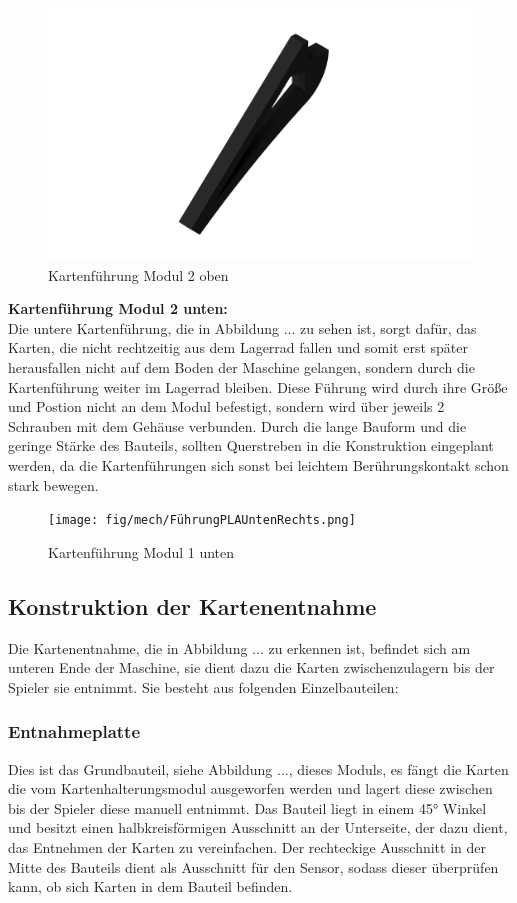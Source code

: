 \begin{figure}
    \centering
    \includegraphics[scale=0.5,page=1]{fig/mech/StopperOben.png}
    \caption{Kartenführung Modul 2 oben}
\end{figure}

\textbf{Kartenführung Modul 2 unten:}\\
Die untere Kartenführung, die in Abbildung ... zu sehen ist, sorgt dafür, das Karten, die nicht rechtzeitig aus dem Lagerrad fallen und somit erst später
herausfallen nicht auf dem Boden der Maschine gelangen, sondern durch die Kartenführung weiter im Lagerrad bleiben. Diese Führung
wird durch ihre Größe und Postion nicht an dem Modul befestigt, sondern wird über jeweils 2 Schrauben mit dem Gehäuse
verbunden. Durch die lange Bauform und die geringe Stärke des Bauteils, sollten Querstreben in die Konstruktion eingeplant werden,
da die Kartenführungen sich sonst bei leichtem Berührungskontakt schon stark bewegen.



\begin{figure}
    \centering
    \texttt{[image: fig/mech/FührungPLAUntenRechts.png]}
    \caption{Kartenführung Modul 1 unten}
\end{figure}

\subsection{Konstruktion der Kartenentnahme}
Die Kartenentnahme, die in Abbildung ... zu erkennen ist, befindet sich am unteren Ende der Maschine, sie dient dazu die Karten zwischenzulagern bis der Spieler
sie entnimmt. Sie besteht aus folgenden Einzelbauteilen:

\subsubsection{Entnahmeplatte }
Dies ist das Grundbauteil, siehe Abbildung ..., dieses Moduls, es fängt die Karten die vom Kartenhalterungsmodul ausgeworfen werden und lagert diese zwischen bis
der Spieler diese manuell entnimmt. Das Bauteil liegt in einem 45° Winkel und besitzt einen halbkreisförmigen Ausschnitt
an der Unterseite, der dazu dient, das Entnehmen der Karten zu vereinfachen. Der rechteckige Ausschnitt in der Mitte des
Bauteils dient als Ausschnitt für den Sensor, sodass dieser überprüfen kann, ob sich Karten in dem Bauteil befinden.

